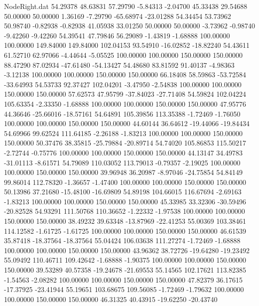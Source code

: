\begin{filecontents}{NodeRight.dat}
  54.29378   48.63831   57.29790    -5.84313   -2.04700   45.33438   29.54688   50.00000   50.00000    1.36169   -7.29790  -65.68974  -23.01288
  54.34454   53.73962   50.98740    -0.82938   -0.82938   41.05938   33.01250   50.00000   50.00000   -3.73962   -0.98740   -9.42260   -9.42260
  54.39541   47.79846   56.29089    -1.43819   -1.68888  100.00000  100.00000  149.84000  149.84000  102.04153   93.54910  -16.02852  -18.82240
  54.43611   61.52710   62.97066    -4.44644   -5.05525  100.00000  100.00000  150.00000  150.00000   88.47290   87.02934  -47.61480  -54.13427
  54.48680   83.81592   91.40137    -4.98363   -3.12138  100.00000  100.00000  150.00000  150.00000   66.18408   58.59863  -53.72584  -33.64993
  54.53733   92.37427  102.04201    -3.47950   -2.54838  100.00000  100.00000  150.00000  150.00000   57.62573   47.95799  -37.84023  -27.71408
  54.59824  102.04224  105.63354    -2.33350   -1.68888  100.00000  100.00000  150.00000  150.00000   47.95776   44.36646  -25.66016  -18.57161
  54.64891  105.39856  113.35388    -1.72469   -1.76050  100.00000  100.00000  150.00000  150.00000   44.60144   36.64612  -19.44066  -19.84434
  54.69966   99.62524  111.64185    -2.26188   -1.83213  100.00000  100.00000  150.00000  150.00000   50.37476   38.35815  -25.79884  -20.89714
  54.74020  105.86853  115.50217    -2.72744   -0.75776  100.00000  100.00000  150.00000  150.00000   44.13147   34.49783  -31.01113   -8.61571
  54.79089  110.03052  113.79013    -0.79357   -2.19025  100.00000  100.00000  150.00000  150.00000   39.96948   36.20987   -8.97046  -24.75854
  54.84149   99.86014  112.78320    -1.36657   -1.47400  100.00000  100.00000  150.00000  150.00000   50.13986   37.21680  -15.48100  -16.69809
  54.89198  104.66015  116.67694    -2.69163   -1.83213  100.00000  100.00000  150.00000  150.00000   45.33985   33.32306  -30.59496  -20.82528
  54.93291  111.50768  110.36652    -1.22332   -1.97538  100.00000  100.00000  150.00000  150.00000   38.49232   39.63348  -13.87969  -22.41253
  55.00369  103.38461  114.12582    -1.61725   -1.61725  100.00000  100.00000  150.00000  150.00000   46.61539   35.87418  -18.37564  -18.37564
  55.04424  106.03638  111.27274    -1.72469   -1.68888  100.00000  100.00000  150.00000  150.00000   43.96362   38.72726  -19.64280  -19.23492
  55.09492  110.46711  109.42642    -1.68888   -1.90375  100.00000  100.00000  150.00000  150.00000   39.53289   40.57358  -19.24678  -21.69553
  55.14565  102.17621  113.82385    -1.54563   -2.08282  100.00000  100.00000  150.00000  150.00000   47.82379   36.17615  -17.37925  -23.41944
  55.19651  103.68675  109.56085    -1.72469   -1.79632  100.00000  100.00000  150.00000  150.00000   46.31325   40.43915  -19.62250  -20.43740

\end{filecontents}
